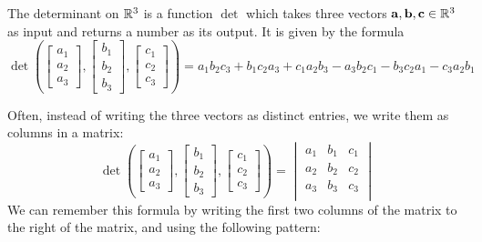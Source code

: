 \documentclass{ximera}
\begin{document}
\begin{definition}
  The determinant on $\mathbb R^3$ is a function $\det$ which takes three
  vectors $\mathbf{a},\mathbf{b},\mathbf{c} \in \mathbb R^3$ as input and returns a
  number as its output.  It is given by the formula
  \[
  \det\left(\begin{bmatrix} a_1 \\ a_2 \\a_3 \end{bmatrix}, \begin{bmatrix} b_1 \\ b_2 \\b_3 \end{bmatrix}, \begin{bmatrix} c_1 \\ c_2 \\c_3 \end{bmatrix} \right)  = a_1b_2c_3+b_1c_2a_3+c_1a_2b_3-a_3b_2c_1-b_3c_2a_1-c_3a_2b_1
  \]  
\end{definition}

Often, instead of writing the three vectors as distinct entries, we
write them as columns in a matrix:
\[
\det\left(\begin{bmatrix} a_1 \\ a_2 \\a_3 \end{bmatrix}, \begin{bmatrix} b_1 \\ b_2 \\b_3 \end{bmatrix}, \begin{bmatrix} c_1 \\ c_2 \\c_3 \end{bmatrix} \right) = 
\begin{vmatrix} 
  a_1 & b_1 & c_1\\
  a_2 & b_2 & c_2\\
  a_3 & b_3 & c_3\\
\end{vmatrix}
\]
We can remember this formula by writing the first two columns of the
matrix to the right of the matrix, and using the following pattern:
	
\end{document}
